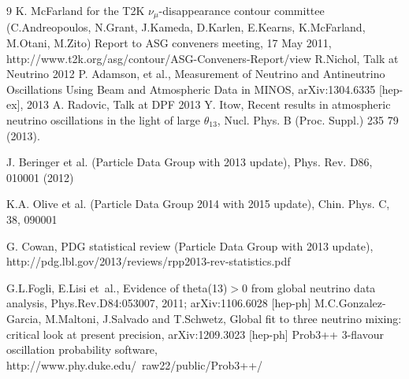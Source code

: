 \begin{thebibliography}{9}
%
%
  K. McFarland for the T2K $\nu_{\mu}$-disappearance contour committee 
  (C.Andreopoulos, N.Grant, J.Kameda, D.Karlen, E.Kearns, K.McFarland, M.Otani, M.Zito)
  Report to ASG conveners meeting, 17 May 2011,
  http://www.t2k.org/asg/contour/ASG-Conveners-Report/view
%
%
  R.Nichol,
  Talk at Neutrino 2012
  P. Adamson, et al.,
  Measurement of Neutrino and Antineutrino Oscillations Using Beam and Atmospheric Data in MINOS,
  arXiv:1304.6335 [hep-ex], 2013
  A. Radovic,
  Talk at DPF 2013
  Y. Itow,
  Recent results in atmospheric neutrino oscillations in the light of large $\theta_{13}$,
  Nucl. Phys. B (Proc. Suppl.) 235 79 (2013).

J. Beringer et al. (Particle Data Group with 2013 update), 
Phys. Rev. D86, 010001 (2012)

K.A. Olive et al. (Particle Data Group 2014 with 2015 update), 
Chin. Phys. C, 38, 090001

G. Cowan, PDG statistical review (Particle Data Group with 2013 update),
http://pdg.lbl.gov/2013/reviews/rpp2013-rev-statistics.pdf

% 
%
%
%
  G.L.Fogli, E.Lisi et~al.,
  Evidence of theta(13)$>$0 from global neutrino data analysis,
  Phys.Rev.D84:053007, 2011; arXiv:1106.6028 [hep-ph]
 M.C.Gonzalez-Garcia, M.Maltoni, J.Salvado and T.Schwetz,
 Global fit to three neutrino mixing: critical look at present precision,
 arXiv:1209.3023 [hep-ph]
%
%
%
%
 Prob3++ 3-flavour oscillation probability software,
 http://www.phy.duke.edu/~raw22/public/Prob3++/
 

\end{thebibliography}
